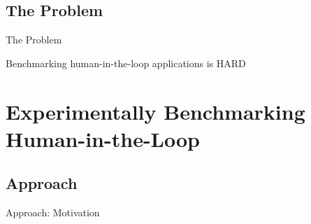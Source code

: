 \documentclass[aspectratio=1610]{beamer}
\begin{document}
\subsection{The Problem}
\begin{frame}{The Problem}
    \begin{Large}
        \centering%
        Benchmarking human-in-the-loop applications is HARD\\
    \end{Large}
\end{frame}
\section{Experimentally Benchmarking Human-in-the-Loop}
\subsection{Approach}

\begin{frame}{Approach: Motivation}
    \begin{center}
        \only<2>{%
        }%
    \end{center}
\end{frame}
\end{document}
